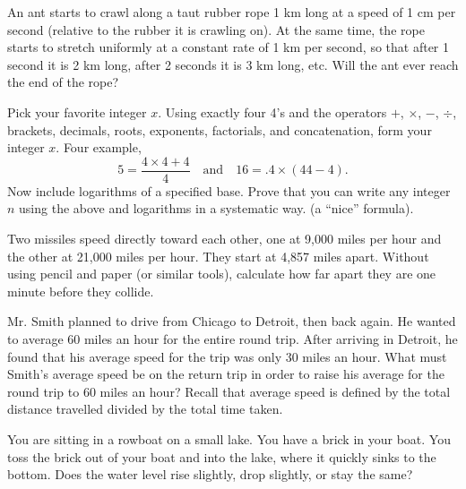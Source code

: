 \documentclass[12pt]{article}
\begin{document}
    \begin{exercise}
        An ant starts to crawl along a taut rubber rope 1 km long at a speed of 1 cm per second (relative to the rubber it is crawling on). At the same time, the rope starts to stretch uniformly at a constant rate of 1 km per second, so that after 1 second it is 2 km long, after 2 seconds it is 3 km long, etc. Will the ant ever reach the end of the rope?
    \end{exercise}

    \begin{exercise}
        Pick your favorite integer \(x\). Using exactly four 4's and the operators \(+\), \(\times\), \(-\), \(\div\), brackets, decimals, roots, exponents, factorials, and concatenation, form your integer \(x\). Four example, 
        \[5 = \frac{4\times 4 + 4}{4}\quad\text{and}\quad 16 = .4\times (44-4).\]
        Now include logarithms of a specified base. Prove that you can write any integer \(n\) using the above and logarithms in a systematic way. (a ``nice'' formula).
    \end{exercise}
    
    \begin{exercise}
        Two missiles speed directly toward each other, one at 9,000 miles per hour and the other at 21,000 miles per hour. They start at 4,857 miles apart. Without using pencil and paper (or similar tools), calculate how far apart they are one minute before they collide.
    \end{exercise}
    
    \begin{exercise}
        Mr. Smith planned to drive from Chicago to Detroit, then back again. He wanted to average 60 miles an hour for the entire round trip. After arriving in Detroit, he found that his average speed for the trip was only 30 miles an hour. What must Smith's average speed be on the return trip in order to raise his average for the round trip to 60 miles an hour? Recall that average speed is defined by the total distance travelled divided by the total time taken.
    \end{exercise}
    
    \begin{exercise}
        You are sitting in a rowboat on a small lake. You have a brick in your boat. You toss the brick out of your boat and into the lake, where it quickly sinks to the bottom. Does the water level rise slightly, drop slightly, or stay the same?
    \end{exercise}
    
\end{document}
